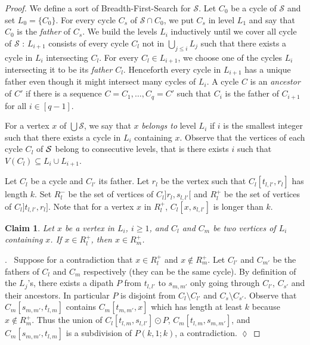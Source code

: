 \documentclass[utf8,10pt]{article}
\theoremstyle{plain}
\newtheorem{claim}{Claim}[theorem]
\theoremstyle{definition}
\theoremstyle{remark}
\newenvironment{subproof}{\par\noindent {\it Subproof}.\ }{\hfill$\lozenge$\par\vspace{11pt}}
\begin{document}
\begin{proof}
We define a sort of Breadth-First-Search for $\mathcal{S}$.
Let $C_0$ be a cycle of $\mathcal{S}$ and set $L_0 = \{C_0\}$. For every cycle $C_s$ of $\mathcal{S}\cap C_0$, we put $C_s$ in level $L_1$ and say that $C_0$ is the \textit{father} of $C_s$. We build  the levels $L_i$ inductively
until we cover all cycle of $\mathcal{S}$ : $L_{i+1}$ consists of every cycle $C_l$ not in $\bigcup_{j \leq i} L_j$ such that 
there exists a cycle in $L_i$ intersecting $C_l$.  For every $C_l\in L_{i+1}$, we choose one of the cycles $L_{i}$ intersecting it to be its {\it  father}  $C_l$. Henceforth every cycle in $L_{i+1}$ has a unique  father even though it might intersect many cycles of $L_i$.
A cycle $C$ is an {\it ancestor} of $C'$ if there is a sequence $C=C_1, \dots , C_q=C'$ such that $C_i$ is the father of $C_{i+1}$ for all $i\in [q-1]$.

For a vertex $x$ of $\bigcup \mathcal{S}$, we say that $x$ \textit{belongs to} level $L_i$ if
$i$ is the smallest integer such that there exists a cycle in $L_i$ containing $x$. Observe that the vertices of each cycle $C_l$ of ${\cal S}$ belong to consecutive levels, that is there exists $i$ such that $V(C_l)\subseteq L_i\cup L_{i+1}$.




Let $C_l$ be a cycle and $C_{l'}$ its father. 
Let $r_l$ be the vertex such that $C_l[t_{l,l'}, r_l]$ has length $k$.
Set $R^-_l$ be the set of vertices of $C_l]r_l, s_{l,l'}[$  and $R^+_l$ be the set of vertices of $C_l ]t_{l,l'}, r_l]$. Note that for a vertex $x$ in  $R^+_l$, $C_l[x,s_{l,l'}]$ is longer than $k$. 

\begin{claim}\label{claim:Rpos}
Let $x$ be a vertex in $L_i$, $i\geq 1$, and $C_l$ and $C_m$ be two vertices of $L_i$ containing $x$.
If $x \in R^+_l$, then  $x \in  R^+_m$.
\end{claim}

\begin{subproof}
Suppose for a contradiction that $x\in R^+_l$ and $x \not \in  R^+_m$. %
Let $C_{l'}$ and $C_{m'}$ be the fathers of $C_l$ and $C_m$ respectively (they can be the same cycle). 
By definition of the $L_j$'s,  there exists a dipath $P$ from $t_{l,l'}$ to $s_{m,m'}$ only going through $C_{l'}$, $C_{s'}$ and their ancestors.
In particular $P$ is disjoint from $C_l \setminus C_{l'}$ and  $C_s \setminus C_{s'}$.
Observe that $C_m[s_{m,m'},t_{l,m}]$ contains  $C_m[t_{m,m'}, x]$ which has length at least $k$ because $x\notin R^+_m$.
Thus the union of $C_l[t_{l,m},s_{l,l'}] \odot P$, $C_m[t_{l,m},s_{m,m'}]$, and  $C_m[s_{m,m'},t_{l,m}]$ is a subdivision of $P(k,1;k)$, a contradiction.
\end{subproof}


\end{proof}
\end{document}
